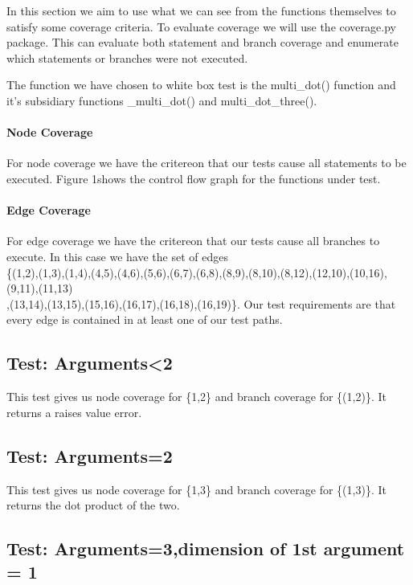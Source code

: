 In this section we aim to use what we can see from the functions themselves to satisfy some coverage
criteria. To evaluate coverage we will use the coverage.py package. This can evaluate both statement and branch coverage and enumerate which statements or branches were not executed.

The function we have chosen to white box test is the multi\_dot() function and it's subsidiary functions \_multi\_dot() and multi\_dot\_three().

\paragraph{Node Coverage}


For node coverage we have the critereon that our tests cause all statements to be executed. Figure 1shows the control flow graph for the functions under test. 



\paragraph{Edge Coverage}

For edge coverage we have the critereon that our tests cause all branches to execute. In this case we have the set of edges \\
\{(1,2),(1,3),(1,4),(4,5),(4,6),(5,6),(6,7),(6,8),(8,9),(8,10),(8,12),(12,10),(10,16),(9,11),(11,13)\\
,(13,14),(13,15),(15,16),(16,17),(16,18),(16,19)\}.
Our test requirements are that every edge is contained in at least one of our test paths.

\subsection{Test: Arguments<2}
This test gives us node coverage for \{1,2\} and branch coverage for \{(1,2)\}. It returns a raises value error.

\subsection{Test: Arguments=2}

This test gives us node coverage for \{1,3\} and branch coverage for \{(1,3)\}. It returns the dot product of the two.


\subsection{Test: Arguments=3,dimension of 1st argument = 1}

